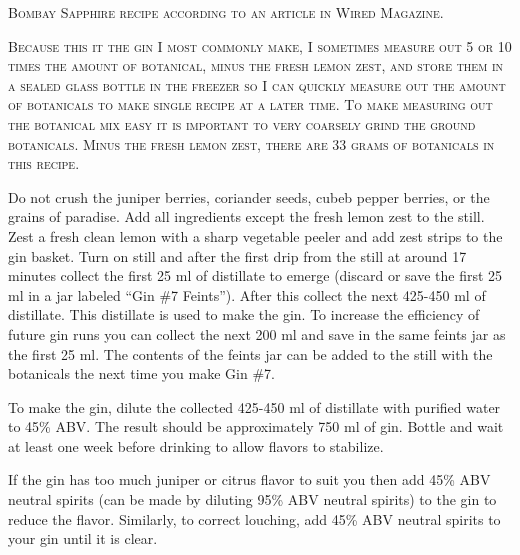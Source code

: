 \documentclass[letterpaper]{recipePMG}
\begin{document}
\newpage

\label{GinNumber7}


\textsc{Bombay Sapphire recipe according to an article in Wired Magazine.}

\textsc{Because this it the gin I most commonly make, I sometimes measure out 5 or 10 times the amount of botanical,  minus the fresh lemon zest, and store them in a sealed glass bottle in the freezer so I can quickly measure out the amount of botanicals to make single recipe at a later time.  To make measuring out the botanical mix easy it is important to very coarsely grind the ground botanicals.    Minus the fresh lemon zest, there are 33 grams of botanicals in this recipe.}

Do not crush the juniper berries, coriander seeds, cubeb pepper berries, or the grains of paradise. Add all ingredients except the fresh lemon zest to the still.   Zest a fresh clean lemon with a sharp vegetable peeler and add zest strips to the gin basket.  Turn on still and after the first drip from the still at around 17 minutes collect the first 25 ml of distillate to emerge (discard or save the first 25 ml in a jar labeled ``Gin \#7 Feints'').  After this collect the next 425-450 ml of distillate. This distillate is used to make the gin. To increase the efficiency of future gin runs you can collect the next 200 ml and save in the same feints jar as the first 25 ml. The contents of the feints jar can be added to the still with the botanicals the next time you make Gin \#7.

To make the gin, dilute the collected 425-450 ml of distillate with purified water to 45\% ABV. The result should be approximately 750 ml of gin. Bottle and wait at least one week before drinking to allow flavors to stabilize.

If the gin has too much juniper or citrus flavor to suit you then 
add 45\% ABV neutral spirits (can be made by diluting 95\% ABV neutral spirits) to the gin to reduce the flavor. Similarly, to correct louching, add 45\% ABV neutral spirits to your gin until it is clear.
\end{document}
